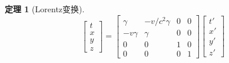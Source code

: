 \documentclass[12pt, a4paper, oneside]{ctexart}
\newtheorem{theorem}{定理}[section] %
\numberwithin{equation}{section}  %
\begin{document}
\begin{theorem}[Lorentz变换]
\begin{equation}
    \begin{bmatrix}
        t\\x\\y\\z
    \end{bmatrix} = \begin{bmatrix}
        \gamma&-v/c^2\gamma&0&0\\
        -v\gamma&\gamma&0&0\\
        0&0&1&0\\
        0&0&0&1
    \end{bmatrix}
    \begin{bmatrix}
        t'\\x'\\y'\\z'
    \end{bmatrix}
\end{equation}
\end{theorem}
\end{document}
